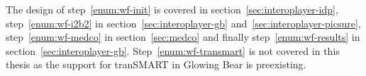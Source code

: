 The design of step~\ref{enum:wf-init} is covered in section~\ref{sec:interoplayer-idp}, 
step~\ref{enum:wf-i2b2} in section~\ref{sec:interoplayer-gb} and~\ref{sec:interoplayer-picsure}, 
step~\ref{enum:wf-medco} in section~\ref{sec:medco} and finally 
step~\ref{enum:wf-results} in section~\ref{sec:interoplayer-gb}.
Step~\ref{enum:wf-transmart} is not covered in this thesis as the support for tranSMART in Glowing Bear is preexisting.

